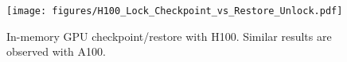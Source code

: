 \begin{figure}[t]
    \centering
    \texttt{[image: figures/H100\_Lock\_Checkpoint\_vs\_Restore\_Unlock.pdf]}
    \vspace{-.5em}
    \caption{In-memory GPU checkpoint/restore with H100. Similar results are observed with A100.}
    \label{fig:in-memory-checkpoint-restore}
\end{figure}